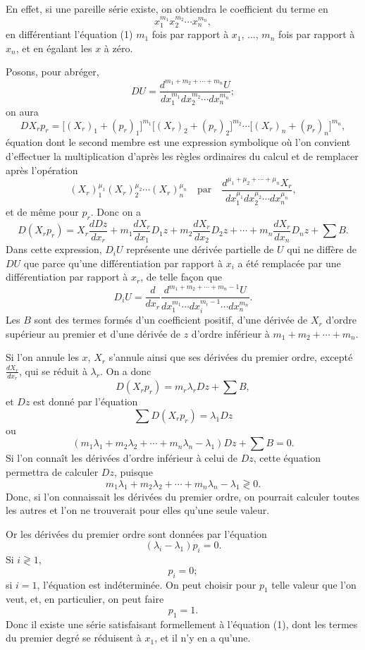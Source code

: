 \documentclass[11pt]{article}
\begin{document}
En effet, si une pareille série existe, on obtiendra le coefficient du terme en
\[
x_1^{m_1}x_2^{m_2}\cdots x_n^{m_n},
\]
en différentiant l’équation (1) $m_1$ fois par rapport à $x_1$, $\ldots$, $m_n$ fois par rapport à $x_n$, et en égalant les $x$ à zéro.

Posons, pour abréger,
\[
DU=\frac{d^{m_1+m_2+\cdots+m_n}U}{dx_1^{m_1}dx_2^{m_2}\cdots dx_n^{m_n}};
\]
on aura
\[
DX_rp_r=\bigl[(X_r)_1+(p_r)_1\bigr]^{m_1}\bigl[(X_r)_2+(p_r)_2\bigr]^{m_2}\cdots\bigl[(X_r)_n+(p_r)_n\bigr]^{m_n},
\]
équation dont le second membre est une expression symbolique où l’on convient d’effectuer la multiplication d’après les règles ordinaires du calcul et de remplacer après l’opération
\[
(X_r)_1^{\mu_1}(X_r)_2^{\mu_2}\cdots(X_r)_n^{\mu_n}
\quad\text{par}\quad
\frac{d^{\mu_1+\mu_2+\cdots+\mu_n}X_r}{dx_1^{\mu_1}dx_2^{\mu_2}\cdots dx_n^{\mu_n}},
\]
et de même pour $p_r$.
Donc on a
\[
D(X_rp_r)=X_r\frac{dDz}{dx_r}
+m_1\frac{dX_r}{dx_1}D_1z
+m_2\frac{dX_r}{dx_2}D_2z
+\cdots+
 m_n\frac{dX_r}{dx_n}D_nz+\sum B.
\]
Dans cette expression, $D_iU$ représente une dérivée partielle de $U$ qui ne diffère de $DU$ que parce qu’une différentiation par rapport à $x_i$ a été remplacée par une différentiation par rapport à $x_r$, de telle façon que
\[
D_iU=\frac{d}{dx_r}\frac{d^{m_1+m_2+\cdots+m_n-1}U}{dx_1^{m_1}\cdots dx_i^{m_i-1}\cdots dx_n^{m_n}}.
\]
Les $B$ sont des termes formés d’un coefficient positif, d’une dérivée de $X_r$ d’ordre supérieur au premier et d’une dérivée de $z$ d’ordre inférieur à $m_1+m_2+\cdots+m_n$.

Si l’on annule les $x$, $X_r$ s’annule ainsi que ses dérivées du premier ordre, excepté $\frac{dX_r}{dx_r}$, qui se réduit à $\lambda_r$. On a donc
\[
D(X_rp_r)=m_r\lambda_rDz+\sum B,
\]
et $Dz$ est donné par l’équation
\[
\sum D(X_rp_r)=\lambda_1Dz
\]
ou
\begin{equation*}\tag{4}
(m_1\lambda_1+m_2\lambda_2+\cdots+m_n\lambda_n-\lambda_1)Dz+\sum B=0.
\end{equation*}
Si l’on connaît les dérivées d’ordre inférieur à celui de $Dz$, cette équation permettra de calculer $Dz$, puisque
\[
m_1\lambda_1+m_2\lambda_2+\cdots+m_n\lambda_n-\lambda_1 \gtrless 0.
\]
Donc, si l’on connaissait les dérivées du premier ordre, on pourrait calculer toutes les autres et l’on ne trouverait pour elles qu’une seule valeur.

Or les dérivées du premier ordre sont données par l’équation
\[
(\lambda_i-\lambda_1)p_i=0.
\]
Si $i\gtrless1$,
\[
p_i=0;
\]
si $i=1$, l’équation est indéterminée. On peut choisir pour $p_1$ telle valeur que l’on veut, et, en particulier, on peut faire
\[
p_1=1.
\]
Donc il existe une série satisfaisant formellement à l’équation (1), dont les termes du premier degré se réduisent à $x_1$, et il n’y en a qu’une.
\end{document}
